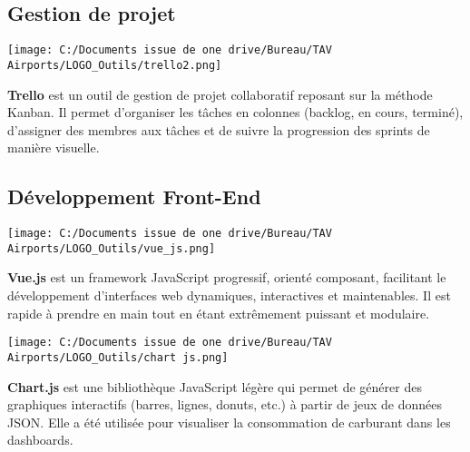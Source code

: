 \documentclass[a4paper,11pt]{report}
\begin{document}
\subsection*{Gestion de projet}

\tcolorbox[title=Trello]
\begin{minipage}{0.15\textwidth}
  \texttt{[image: C:/Documents issue de one drive/Bureau/TAV Airports/LOGO\_Outils/trello2.png]}
\end{minipage}
\hfill
\begin{minipage}{0.8\textwidth}
\textbf{Trello} est un outil de gestion de projet collaboratif reposant sur la méthode Kanban. Il permet d’organiser les tâches en colonnes (backlog, en cours, terminé), d’assigner des membres aux tâches et de suivre la progression des sprints de manière visuelle.
\end{minipage}
\endtcolorbox

\vspace{1em}

\subsection*{Développement Front-End}

\tcolorbox[title=Vue.js]
\begin{minipage}{0.15\textwidth}
  \texttt{[image: C:/Documents issue de one drive/Bureau/TAV Airports/LOGO\_Outils/vue\_js.png]}
\end{minipage}
\hfill
\begin{minipage}{0.8\textwidth}
\textbf{Vue.js} est un framework JavaScript progressif, orienté composant, facilitant le développement d'interfaces web dynamiques, interactives et maintenables. Il est rapide à prendre en main tout en étant extrêmement puissant et modulaire.
\end{minipage}
\endtcolorbox

\tcolorbox[title=Chart.js]
\begin{minipage}{0.15\textwidth}
  \texttt{[image: C:/Documents issue de one drive/Bureau/TAV Airports/LOGO\_Outils/chart js.png]}
\end{minipage}
\hfill
\begin{minipage}{0.8\textwidth}
\textbf{Chart.js} est une bibliothèque JavaScript légère qui permet de générer des graphiques interactifs (barres, lignes, donuts, etc.) à partir de jeux de données JSON. Elle a été utilisée pour visualiser la consommation de carburant dans les dashboards.
\end{minipage}
\endtcolorbox
\end{document}
